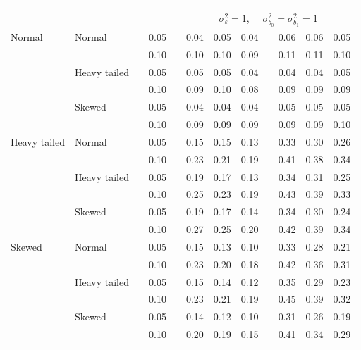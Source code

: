 \documentclass[12pt]{article} %
\begin{document}
\begin{table}[ht]
\begin{scriptsize}
\begin{center}
\begin{tabular}{ll p{.1cm} c p{.1cm} rrr p{.1cm} rrr}
&&&&&&&&&&&\\
& && && \multicolumn{7}{c}{$\sigma_{\varepsilon}^2 = 1$, \ \ $\sigma_{b_0}^2 = \sigma_{b_1}^2 = 1$} \\ \cline{6-12}
Normal       & Normal       && 0.05 &&  0.04 & 0.05 & 0.04 && 0.06 & 0.06 & 0.05 \\ 
             &              && 0.10 &&  0.10 & 0.10 & 0.09 && 0.11 & 0.11 & 0.10 \\ 
             & Heavy tailed && 0.05 &&  0.05 & 0.05 & 0.04 && 0.04 & 0.04 & 0.05 \\ 
             &              && 0.10 &&  0.09 & 0.10 & 0.08 && 0.09 & 0.09 & 0.09 \\ 
             & Skewed       && 0.05 &&  0.04 & 0.04 & 0.04 && 0.05 & 0.05 & 0.05 \\ 
             &              && 0.10 &&  0.09 & 0.09 & 0.09 && 0.09 & 0.09 & 0.10 \\ 
Heavy tailed & Normal       && 0.05 &&  0.15 & 0.15 & 0.13 && 0.33 & 0.30 & 0.26 \\ 
             &              && 0.10 &&  0.23 & 0.21 & 0.19 && 0.41 & 0.38 & 0.34 \\ 
             & Heavy tailed && 0.05 &&  0.19 & 0.17 & 0.13 && 0.34 & 0.31 & 0.25 \\ 
             &              && 0.10 &&  0.25 & 0.23 & 0.19 && 0.43 & 0.39 & 0.33 \\ 
             & Skewed       && 0.05 &&  0.19 & 0.17 & 0.14 && 0.34 & 0.30 & 0.24 \\ 
             &              && 0.10 &&  0.27 & 0.25 & 0.20 && 0.42 & 0.39 & 0.34 \\ 
Skewed       & Normal       && 0.05 &&  0.15 & 0.13 & 0.10 && 0.33 & 0.28 & 0.21 \\ 
             &              && 0.10 &&  0.23 & 0.20 & 0.18 && 0.42 & 0.36 & 0.31 \\ 
             & Heavy tailed && 0.05 &&  0.15 & 0.14 & 0.12 && 0.35 & 0.29 & 0.23 \\ 
             &              && 0.10 &&  0.23 & 0.21 & 0.19 && 0.45 & 0.39 & 0.32 \\ 
             & Skewed       && 0.05 &&  0.14 & 0.12 & 0.10 && 0.31 & 0.26 & 0.19 \\ 
             &              && 0.10 &&  0.20 & 0.19 & 0.15 && 0.41 & 0.34 & 0.29 \\ 



\end{tabular}
\end{center}
\end{scriptsize}
\end{table}
\end{document}
